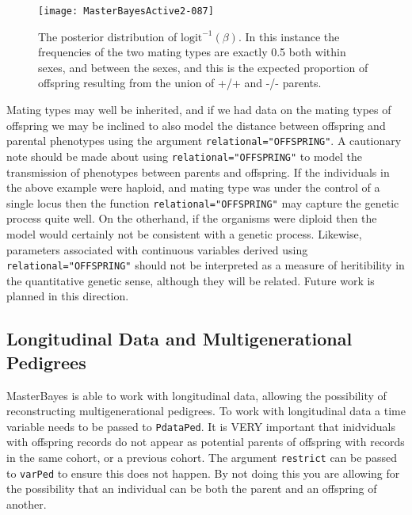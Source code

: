 \documentclass{article}
\begin{document}
\begin{figure}[!h]
\begin{center}
\texttt{[image: MasterBayesActive2-087]}
\end{center}
\caption{The posterior distribution of $\textrm{logit}^{-1}(\beta)$.  In this instance the frequencies of the two mating types are exactly 0.5 both within sexes, and between the sexes, and this is the expected proportion of offspring resulting from the union of +/+ and -/- parents.}
\label{model.ass.mat}
\end{figure}

Mating types may well be inherited, and if we had data on the mating types of offspring we may be inclined to also model the distance between offspring and parental phenotypes using the argument \texttt{relational="OFFSPRING"}.  A cautionary note should be made about using \texttt{relational="OFFSPRING"} to model the transmission of phenotypes between parents and offspring.  If the individuals in the above example were haploid, and mating type was under the control of a single locus then the function \texttt{relational="OFFSPRING"} may capture the genetic process quite well.  On the otherhand, if the organisms were diploid then the model would certainly not be consistent with a genetic process.  Likewise, parameters associated with continuous variables derived using \texttt{relational="OFFSPRING"} should not be interpreted as a measure of heritibility in the quantitative genetic sense, although they will be related.  Future work is planned in this direction.

\subsection{Longitudinal Data and Multigenerational Pedigrees}
\label{pedigree-sec}

MasterBayes is able to work with longitudinal data, allowing the possibility of reconstructing multigenerational pedigrees.  To work with longitudinal data a time variable needs to be passed to \texttt{PdataPed}.  It is VERY important that inidviduals with offspring records do not appear as potential parents of offspring with records in the same cohort, or a previous cohort.  The argument \texttt{restrict} can be passed to \texttt{varPed} to ensure this does not happen. By not doing this you are allowing for the possibility that an individual can be both the parent and an offspring of another.  
\end{document}
